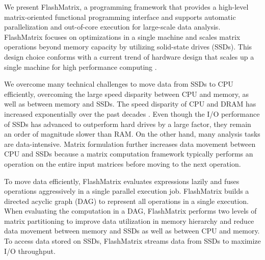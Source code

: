 


We present FlashMatrix, a programming framework that provides a high-level
matrix-oriented functional programming interface and supports automatic
parallelization and out-of-core execution for large-scale data analysis.
FlashMatrix focuses on optimizations in
a single machine and scales matrix operations beyond memory capacity by utilizing
solid-state drives (SSDs). This design choice conforms with a current trend of
hardware design that scales up a single machine for high performance computing
\cite{Ang14}.



We overcome many technical challenges to move data from SSDs to CPU efficiently,
overcoming the large speed disparity between CPU and memory, as well as between
memory and SSDs. The speed disparity of CPU and DRAM has increased exponentially
over the past decades \cite{Wilkes01}. Even though the I/O performance of SSDs
has advanced to outperform hard drives by a large factor, they remain an order
of magnitude slower than RAM. On the other hand, many analysis tasks are
data-intensive. Matrix
formulation further increases data movement between CPU and SSDs because
a matrix computation framework typically performs an operation
on the entire input matrices before moving to the next operation.

To move data efficiently, FlashMatrix evaluates expressions lazily and fuses
operations aggressively in a single parallel execution job.
FlashMatrix builds a directed acyclic graph (DAG) to represent all operations
in a single execution. When evaluating the computation in a DAG, FlashMatrix
performs two levels of matrix partitioning to improve data utilization in
memory hierarchy and reduce data movement between memory and SSDs
as well as between CPU and memory. To access data stored on SSDs, FlashMatrix
streams data from SSDs to maximize I/O throughput.


